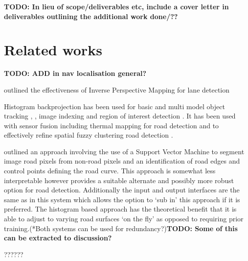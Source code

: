 \documentclass[]{aiaa-tc}%
\begin{document}
\textbf{TODO: In lieu of scope/deliverables etc, include a cover letter in deliverables outlining the additional work done/??}

\section{Related works}
\textbf{TODO: ADD in nav localisation general?}

\citet{ipmForLaneTracking} outlined the effectiveness of Inverse Perspective Mapping for lane detection 

Histogram backprojection has been used for basic \citep{histBackObjectTracking} and multi model object tracking \citep{histBackMultiObjectTrack}, \citep{histBackObjectMultiLighting} , image indexing \citep{histBackImageIndexing} and region of interest detection \citep{histBackObjectOfInterestDetection}. It has been used with sensor fusion including thermal mapping for road detection \citep{histBackThermal} and to effectively refine spatial fuzzy clustering road detection \citep{histBackRefineShadows}.

\citet{moncularLaneDetectAndTrack} outlined an approach involving the use of a Support Vector Machine to segment image road pixels from non-road pixels and an identification of road edges and control points defining the road curve. This approach is somewhat less interpretable however provides a suitable alternate and possibly more robust option for road detection. Additionally the input and output interfaces are the same as in this system which allows the option to `sub in' this approach if it is preferred. The histogram based approach has the theoretical benefit that it is able to adjust to varying road surfaces `on the fly' as opposed to requiring prior training.(*Both systems can be used for redundancy?)\textbf{TODO: Some of this can be extracted to discussion?}



??????
\end{document}
